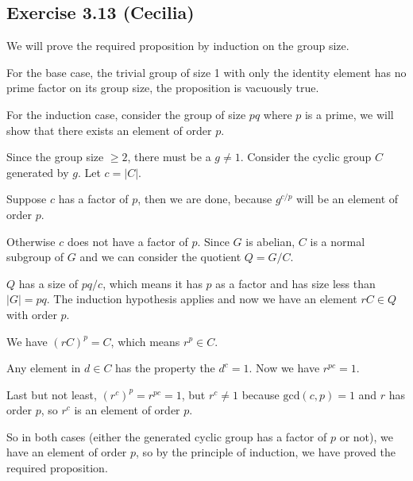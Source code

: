 \subsection*{Exercise 3.13 (Cecilia)}
We will prove the required proposition by induction on the group size.

For the base case, the trivial group of size 1 with only the identity element has no prime factor on its group size, the proposition is vacuously true.

For the induction case, consider the group of size $ pq $ where $ p $ is a prime, we will show that there exists an element of order $ p $.

Since the group size $ \ge 2 $, there must be a $ g \ne 1 $. Consider the cyclic group $ C $ generated by $ g $. Let $ c = |C|$.

Suppose $ c $ has a factor of $ p $, then we are done, because $ g^{c/p} $ will be an element of order $ p $.

Otherwise $ c $ does not have a factor of $ p $. Since $ G $ is abelian, $ C $ is a normal subgroup of $ G $ and we can consider the quotient $ Q = G/C $.

$ Q $ has a size of $ pq/c $, which means it has $ p $ as a factor and has size less than $ |G| = pq $. The induction hypothesis applies and now we have an element $ rC \in Q $ with order $ p $.

We have $ (rC)^p = C $, which means $ r^p \in C $.

Any element in $ d \in C $ has the property the $ d^c = 1 $. Now we have $ r^{pc} = 1 $.

Last but not least, $ (r^c)^p = r^{pc} = 1 $, but $ r^c \ne 1 $ because $ \text{gcd}(c, p) = 1 $ and $ r $ has order $ p $, so $ r^c $ is an element of order $ p $.

So in both cases (either the generated cyclic group has a factor of $ p $ or not), we have an element of order $ p $, so by the principle of induction, we have proved the required proposition.